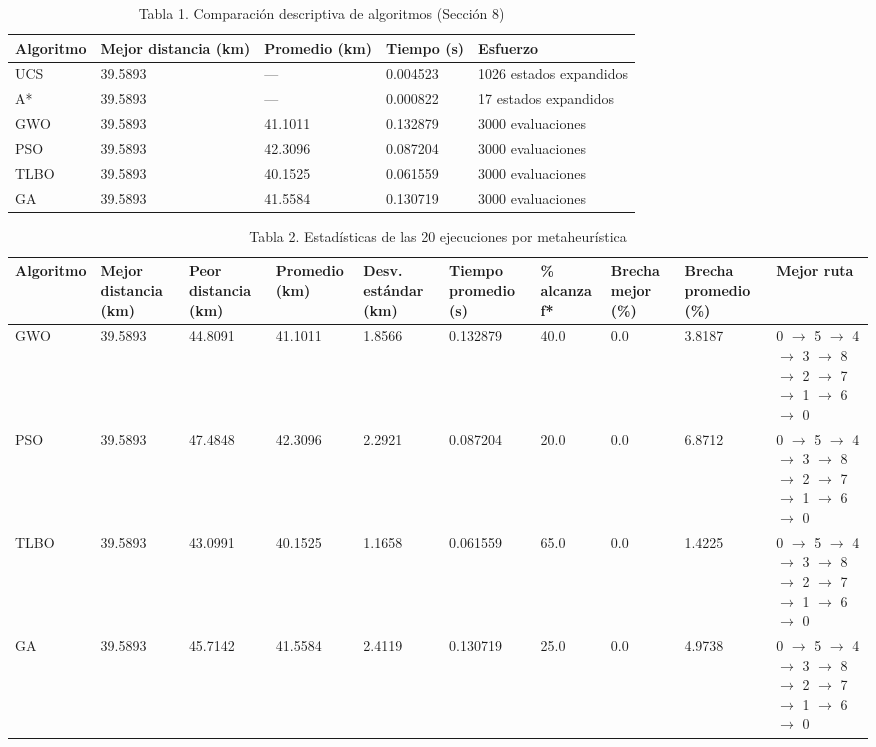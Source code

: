 
\begin{table}[htbp]
  \centering
  \caption{Tabla 1. Comparación descriptiva de algoritmos (Sección 8)}
  \label{tab:tabla-1-comparacion-principal}
  \begin{tabular}{lllll}
    \toprule
    Algoritmo & Mejor distancia (km) & Promedio (km) & Tiempo (s) & Esfuerzo \\
    \midrule
    UCS & 39.5893 & --- & 0.004523 & 1026 estados expandidos \\
    A* & 39.5893 & --- & 0.000822 & 17 estados expandidos \\
    GWO & 39.5893 & 41.1011 & 0.132879 & 3000 evaluaciones \\
    PSO & 39.5893 & 42.3096 & 0.087204 & 3000 evaluaciones \\
    TLBO & 39.5893 & 40.1525 & 0.061559 & 3000 evaluaciones \\
    GA & 39.5893 & 41.5584 & 0.130719 & 3000 evaluaciones \\
    \bottomrule
  \end{tabular}
\end{table}

\begin{table}[htbp]
  \centering
  \caption{Tabla 2. Estadísticas de las 20 ejecuciones por metaheurística}
  \label{tab:tabla-2-estadisticas-metaheuristicas}
  \begin{tabular}{llllllllll}
    \toprule
    Algoritmo & Mejor distancia (km) & Peor distancia (km) & Promedio (km) & Desv. estándar (km) & Tiempo promedio (s) & \% alcanza f* & Brecha mejor (\%) & Brecha promedio (\%) & Mejor ruta \\
    \midrule
    GWO & 39.5893 & 44.8091 & 41.1011 & 1.8566 & 0.132879 & 40.0 & 0.0 & 3.8187 & 0 $\rightarrow$ 5 $\rightarrow$ 4 $\rightarrow$ 3 $\rightarrow$ 8 $\rightarrow$ 2 $\rightarrow$ 7 $\rightarrow$ 1 $\rightarrow$ 6 $\rightarrow$ 0 \\
    PSO & 39.5893 & 47.4848 & 42.3096 & 2.2921 & 0.087204 & 20.0 & 0.0 & 6.8712 & 0 $\rightarrow$ 5 $\rightarrow$ 4 $\rightarrow$ 3 $\rightarrow$ 8 $\rightarrow$ 2 $\rightarrow$ 7 $\rightarrow$ 1 $\rightarrow$ 6 $\rightarrow$ 0 \\
    TLBO & 39.5893 & 43.0991 & 40.1525 & 1.1658 & 0.061559 & 65.0 & 0.0 & 1.4225 & 0 $\rightarrow$ 5 $\rightarrow$ 4 $\rightarrow$ 3 $\rightarrow$ 8 $\rightarrow$ 2 $\rightarrow$ 7 $\rightarrow$ 1 $\rightarrow$ 6 $\rightarrow$ 0 \\
    GA & 39.5893 & 45.7142 & 41.5584 & 2.4119 & 0.130719 & 25.0 & 0.0 & 4.9738 & 0 $\rightarrow$ 5 $\rightarrow$ 4 $\rightarrow$ 3 $\rightarrow$ 8 $\rightarrow$ 2 $\rightarrow$ 7 $\rightarrow$ 1 $\rightarrow$ 6 $\rightarrow$ 0 \\
    \bottomrule
  \end{tabular}
\end{table}

